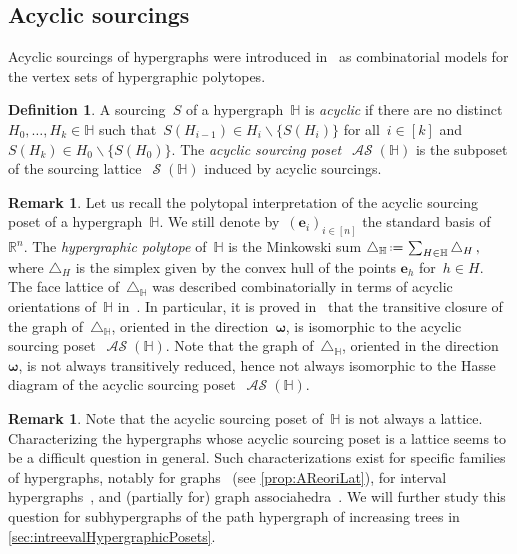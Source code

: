\documentclass{amsart}
\theoremstyle{definition}
\newtheorem{definition}[theorem]{Definition}
\newtheorem{remark}[theorem]{Remark}
\newcommand{\R}{\mathbb{R}} %
\renewcommand{\b}[1]{\boldsymbol{#1}} %
\newcommand{\ssm}{\smallsetminus} %
\newcommand{\eqdef}{\mbox{\,\raisebox{0.2ex}{\scriptsize\ensuremath{\mathrm:}}\ensuremath{=}\,}} %
\newcommand{\simplex}{\triangle} %
\newcommand{\darkblue}{\color{darkblue}} %
\newcommand{\defn}[1]{\textsl{\darkblue #1}} %
\DeclareMathOperator{\Sour}{\mathcal{S}}  %
\DeclareMathOperator{\ASour}{\mathcal{AS}}  %
\newcommand{\HH}{\mathbb H}  %
\begin{document}

\subsection{Acyclic sourcings}
\label{subsec:acyclicSourcings}

Acyclic sourcings of hypergraphs were introduced in~\cite{BenedettiBergeronMachacek,BergeronPilaud} as combinatorial models for the vertex sets of hypergraphic polytopes.

\begin{definition}
\label{def:ASour}
A sourcing~$S$ of a hypergraph~$\HH$ is \defn{acyclic} if there are no distinct~$H_0, \dots, H_k \in \HH$ such that~$S(H_{i-1}) \in H_i \ssm \{S(H_i)\}$ for all~$i \in [k]$ and~$S(H_k) \in H_0 \ssm \{S(H_0)\}$.
The \defn{acyclic sourcing poset}~$\ASour(\HH)$ is the subposet of the sourcing lattice~$\Sour(\HH)$ induced by acyclic sourcings.
\end{definition}

\begin{remark}
Let us recall the polytopal interpretation of the acyclic sourcing poset of a hypergraph~$\HH$.
We still denote by~$(\b{e}_i)_{i \in [n]}$ the standard basis of~$\R^n$.
The \defn{hypergraphic polytope} of~$\HH$ is the Minkowski sum
\(
\simplex_\HH \eqdef \sum_{H\in \HH} \simplex_H\,,
\)
where $\simplex_H$ is the simplex given by the convex hull of the points $\b{e}_h$ for~$h \in H$.
The face lattice of~$\simplex_\HH$ was described combinatorially in terms of acyclic orientations of~$\HH$ in~\cite{BenedettiBergeronMachacek}.
In particular, it is proved in~\cite{Gelinas} that the transitive closure of the graph of~$\simplex_\HH$, oriented in the direction~$\b{\omega}$, is isomorphic to the acyclic sourcing poset~$\ASour(\HH)$.
Note that the graph of~$\simplex_\HH$, oriented in the direction~$\b{\omega}$, is not always transitively reduced, hence not always isomorphic to the Hasse diagram of the acyclic sourcing poset~$\ASour(\HH)$.
\end{remark}

\begin{remark}
\label{rem:ASourLat}
Note that the acyclic sourcing poset of~$\HH$ is not always a lattice.
Characterizing the hypergraphs whose acyclic sourcing poset is a lattice seems to be a difficult question in general.
Such characterizations exist for specific families of hypergraphs, notably for graphs~\cite{Pilaud-acyclicReorientationLattices} (see \cref{prop:AReoriLat}), for interval hypergraphs~\cite{BergeronPilaud}, and (partially for) graph associahedra~\cite{BarnardMcConville}.
We will further study this question for subhypergraphs of the path hypergraph of increasing trees in \cref{sec:intreevalHypergraphicPosets}.
\end{remark}
\end{document}

